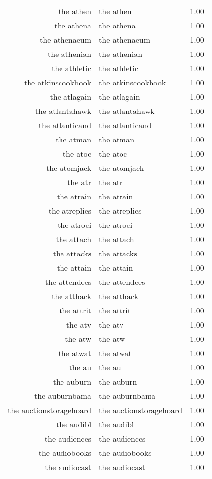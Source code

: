\begin{table}[ht]
\begin{tabular}{rlr}
  the athen & the athen & 1.00 \\ 
  the athena & the athena & 1.00 \\ 
  the athenaeum & the athenaeum & 1.00 \\ 
  the athenian & the athenian & 1.00 \\ 
  the athletic & the athletic & 1.00 \\ 
  the atkinscookbook & the atkinscookbook & 1.00 \\ 
  the atlagain & the atlagain & 1.00 \\ 
  the atlantahawk & the atlantahawk & 1.00 \\ 
  the atlanticand & the atlanticand & 1.00 \\ 
  the atman & the atman & 1.00 \\ 
  the atoc & the atoc & 1.00 \\ 
  the atomjack & the atomjack & 1.00 \\ 
  the atr & the atr & 1.00 \\ 
  the atrain & the atrain & 1.00 \\ 
  the atreplies & the atreplies & 1.00 \\ 
  the atroci & the atroci & 1.00 \\ 
  the attach & the attach & 1.00 \\ 
  the attacks & the attacks & 1.00 \\ 
  the attain & the attain & 1.00 \\ 
  the attendees & the attendees & 1.00 \\ 
  the atthack & the atthack & 1.00 \\ 
  the attrit & the attrit & 1.00 \\ 
  the atv & the atv & 1.00 \\ 
  the atw & the atw & 1.00 \\ 
  the atwat & the atwat & 1.00 \\ 
  the au & the au & 1.00 \\ 
  the auburn & the auburn & 1.00 \\ 
  the auburnbama & the auburnbama & 1.00 \\ 
  the auctionstoragehoard & the auctionstoragehoard & 1.00 \\ 
  the audibl & the audibl & 1.00 \\ 
  the audiences & the audiences & 1.00 \\ 
  the audiobooks & the audiobooks & 1.00 \\ 
  the audiocast & the audiocast & 1.00 \\ 

\end{tabular}
\end{table}
